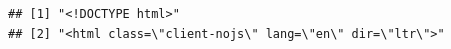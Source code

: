 \documentclass[
  12pt,
]{style/krantz}
\begin{document}
\begin{verbatim}
## [1] "<!DOCTYPE html>"                                                                                                                                                                                                                                                                                                                                                                                                                                                                                                                                                                                                                                                                                                                                                                                                                                                                                                                                                                                                                                                                                                                                        
## [2] "<html class=\"client-nojs\" lang=\"en\" dir=\"ltr\">"                                                                                                                                                                                                                                                                                                                                                                                                                                                                                                                                                                                                                                                                                                                                                                                                                                                                                                                                                                                                                                                                                                   

\end{verbatim}
\end{document}
